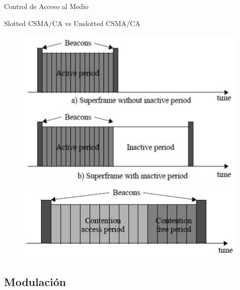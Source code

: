 \documentclass[aspectratio=169]{beamer}
\begin{document}
\begin{frame}[T]{Control de Acceso al Medio}

Slotted CSMA/CA vs Unslotted CSMA/CA
\vspace{10px}
		\begin{figure}[H]
			\includegraphics[height=.4\textheight]{./imagenes/superframe.jpg}\\
			\vspace{15px}
			\includegraphics[height=.3\textheight]{./imagenes/unsolotted.jpg}
		\end{figure}
\end{frame}

\subsection[Modulación]{Modulación}
\end{document}
